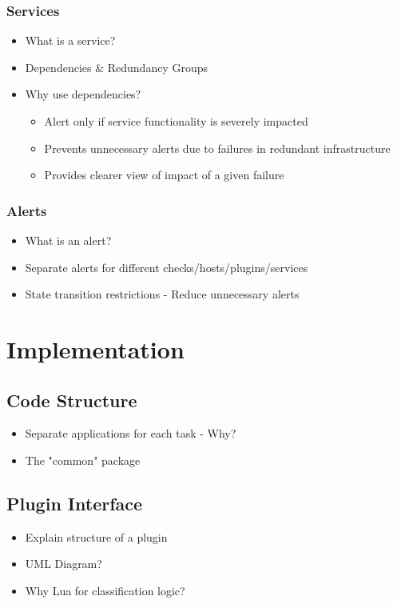 \documentclass[bsc,logo,twoside]{infthesis}
\begin{document}
\subsection{Services}
\begin{itemize}
	\item What is a service?
	\item Dependencies \& Redundancy Groups
	\item Why use dependencies?
	\begin{itemize}
		\item Alert only if service functionality is severely impacted
		\item Prevents unnecessary alerts due to failures in redundant infrastructure
		\item Provides clearer view of impact of a given failure
	\end{itemize}
\end{itemize}

\subsection{Alerts}
\begin{itemize}
	\item What is an alert?
	\item Separate alerts for different checks/hosts/plugins/services
	\item State transition restrictions - Reduce unnecessary alerts
\end{itemize}

\chapter{Implementation}
\section{Code Structure}
\begin{itemize}
	\item Separate applications for each task - Why?
	\item The "common" package
\end{itemize}

\section{Plugin Interface}
\begin{itemize}
	\item Explain structure of a plugin
	\item UML Diagram?
	\item Why Lua for classification logic?
\end{itemize}
\end{document}
